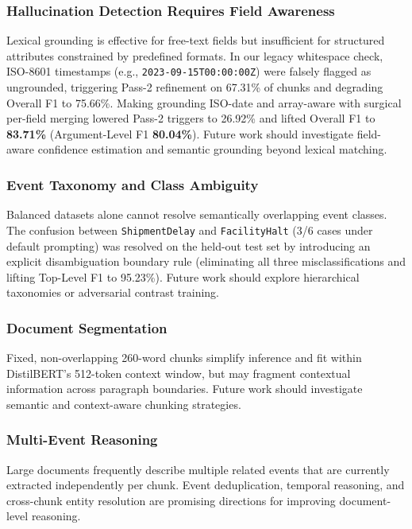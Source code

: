 \documentclass[11pt,a4paper]{article}
\begin{document}
\subsubsection{Hallucination Detection Requires Field Awareness}
Lexical grounding is effective for free-text fields but insufficient for structured attributes constrained by predefined formats. In our legacy whitespace check, ISO-8601 timestamps (e.g., \texttt{2023-09-15T00:00:00Z}) were falsely flagged as ungrounded, triggering Pass-2 refinement on 67.31\% of chunks and degrading Overall F1 to 75.66\%. Making grounding ISO-date and array-aware with surgical per-field merging lowered Pass-2 triggers to 26.92\% and lifted Overall F1 to \textbf{83.71\%} (Argument-Level F1 \textbf{80.04\%}). Future work should investigate field-aware confidence estimation and semantic grounding beyond lexical matching.

\subsubsection{Event Taxonomy and Class Ambiguity}
Balanced datasets alone cannot resolve semantically overlapping event classes. The confusion between \texttt{ShipmentDelay} and \texttt{FacilityHalt} (3/6 cases under default prompting) was resolved on the held-out test set by introducing an explicit disambiguation boundary rule (eliminating all three misclassifications and lifting Top-Level F1 to 95.23\%). Future work should explore hierarchical taxonomies or adversarial contrast training.

\subsubsection{Document Segmentation}
Fixed, non-overlapping 260-word chunks simplify inference and fit within DistilBERT's 512-token context window, but may fragment contextual information across paragraph boundaries. Future work should investigate semantic and context-aware chunking strategies.

\subsubsection{Multi-Event Reasoning}
Large documents frequently describe multiple related events that are currently extracted independently per chunk. Event deduplication, temporal reasoning, and cross-chunk entity resolution are promising directions for improving document-level reasoning.
\end{document}
